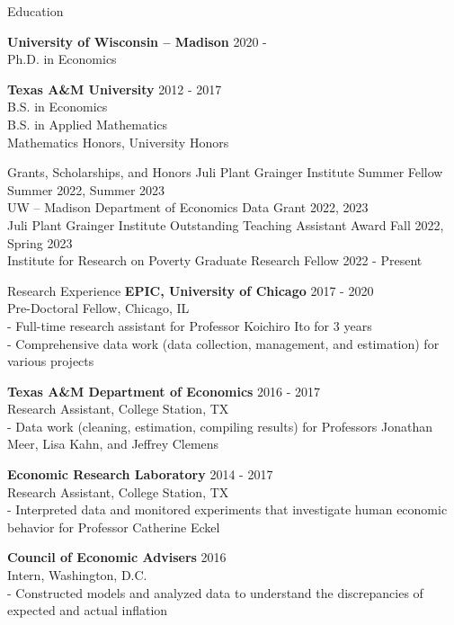 \documentclass{resume} %
\begin{document}

\begin{rSection}{Education}

{\bf University of Wisconsin -- Madison} \hfill {2020 - \phantom{2025}} 
\\{Ph.D. in Economics} 

{\bf Texas A\&M University} \hfill {2012 - 2017} 
\\ {B.S. in Economics} 
\\ {B.S. in Applied Mathematics}
\\ Mathematics Honors, University Honors
\end{rSection}

\begin{rSection}{Grants, Scholarships, and Honors}
{Juli Plant Grainger Institute Summer Fellow} \hfill {Summer 2022, Summer 2023} \\
{UW -- Madison Department of Economics Data Grant} \hfill {2022, 2023} \\
{Juli Plant Grainger Institute Outstanding Teaching Assistant Award} \hfill {Fall 2022, Spring 2023} \\
{Institute for Research on Poverty Graduate Research Fellow} \hfill {2022 -  Present}
\end{rSection}

\begin{rSection}{Research Experience}
{\bf EPIC, University of Chicago} \hfill {2017 - 2020} \\
Pre-Doctoral Fellow, Chicago, IL
\\- Full-time research assistant for Professor Koichiro Ito for 3 years 
\\- Comprehensive data work (data collection, management, and estimation) for various projects 

{\bf Texas A\&M Department of Economics} \hfill {2016 - 2017} \\
Research Assistant, College Station, TX
\\- Data work (cleaning, estimation, compiling results) for Professors Jonathan Meer, Lisa Kahn, and Jeffrey Clemens

{\bf Economic Research Laboratory} \hfill {2014 - 2017} \\
Research Assistant, College Station, TX
\\- Interpreted data and monitored experiments that investigate human economic behavior for Professor Catherine Eckel

{\bf Council of Economic Advisers} \hfill {2016} \\
Intern, Washington, D.C.
\\- Constructed models and analyzed data to understand the discrepancies of expected and actual inflation  
\end{rSection}
\end{document}
